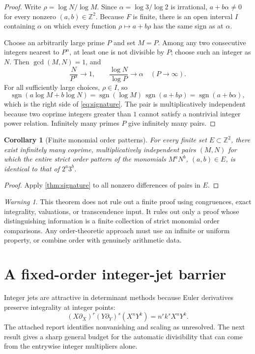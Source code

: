\documentclass[11pt,oneside]{article}
\newtheorem{corollary}[theorem]{Corollary}
\theoremstyle{definition}
\theoremstyle{remark}
\newtheorem{warning}[theorem]{Warning}
\newcommand{\Z}{\mathbb Z}
\newcommand{\sgn}{\operatorname{sgn}}
\begin{document}
\begin{proof}
Write $\rho=\log N/\log M$.  Since
$\alpha=\log3/\log2$ is irrational, $a+b\alpha\ne0$ for every nonzero
$(a,b)\in\Z^2$.  Because $F$ is finite, there is an open interval $I$
containing $\alpha$ on which every function $\rho\mapsto a+b\rho$ has the
same sign as at $\alpha$.

Choose an arbitrarily large prime $P$ and set $M=P$.  Among any two
consecutive integers nearest to $P^\alpha$, at least one is not divisible by
$P$; choose such an integer as $N$.  Then $\gcd(M,N)=1$, and
\[
 \frac{N}{P^\alpha}\longrightarrow1,
 \qquad
 \frac{\log N}{\log P}\longrightarrow\alpha
 \quad(P\to\infty).
\]
For all sufficiently large choices, $\rho\in I$, so
\[
 \sgn(a\log M+b\log N)
 =\sgn(\log M)\,\sgn(a+b\rho)
 =\sgn(a+b\alpha),
\]
which is the right side of \eqref{eq:signature}.  The pair is
multiplicatively independent because two coprime integers greater than $1$
cannot satisfy a nontrivial integer power relation.  Infinitely many primes
$P$ give infinitely many pairs.
\end{proof}

\begin{corollary}[Finite monomial order patterns]
\label{cor:finiteorder}
For every finite set $E\subset\Z^2$, there exist infinitely many coprime,
multiplicatively independent pairs $(M,N)$ for which the entire strict order
pattern of the monomials $M^aN^b$, $(a,b)\in E$, is identical to that of
$2^a3^b$.
\end{corollary}

\begin{proof}
Apply \cref{thm:signature} to all nonzero differences of pairs in $E$.
\end{proof}

\begin{warning}
This theorem does not rule out a finite proof using congruences, exact
integrality, valuations, or transcendence input.  It rules out only a proof
whose distinguishing information is a finite collection of strict monomial
order comparisons.  Any order-theoretic approach must use an infinite or
uniform property, or combine order with genuinely arithmetic data.
\end{warning}

\section{A fixed-order integer-jet barrier}
\label{sec:jets}

Integer jets are attractive in determinant methods because Euler derivatives
preserve integrality at integer points:
\[
 (X\partial_X)^r(Y\partial_Y)^s(X^nY^k)
 =n^rk^sX^nY^k.
\]
The attached report identifies nonvanishing and scaling as unresolved.  The
next result gives a sharp general budget for the automatic divisibility that
can come from the entrywise integer multipliers alone.
\end{document}
